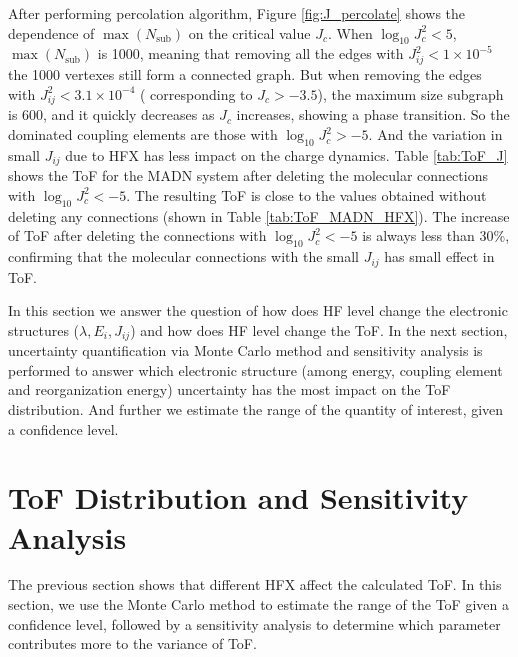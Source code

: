 \documentclass[%
 reprint,
 amsmath,amssymb,
 aps,
]{revtex4-2}
\begin{document}
After performing percolation algorithm, Figure \ref{fig:J_percolate} shows the dependence of $\max({N_\text{sub}})$ on the critical value $J_c$. When $\log_{10} J_c^2 < 5$, $\max({N_\text{sub}})$ is 1000, meaning that removing all the edges with $J_{ij}^2 < 1 \times 10^{-5}$ the 1000 vertexes still form a connected graph. 
But when removing the edges with $J_{ij}^2 < 3.1 \times 10^{-4}$ ( corresponding to $J_c > -3.5$), the maximum size subgraph is 600, and it quickly decreases as $J_c$ increases, showing a phase transition. 
So the dominated coupling elements are those with $\log_{10} J_c^2 > -5$. 
And the variation in small $J_{ij}$ due to HFX has less impact on the charge dynamics. Table \ref{tab:ToF_J} shows the ToF for the MADN system after deleting the molecular connections with  $\log_{10} J_c^2 < -5$. The resulting ToF is close to the values obtained without deleting any connections (shown in Table \ref{tab:ToF_MADN_HFX}).
The increase of ToF after deleting the connections with  $\log_{10} J_c^2 < -5$ is always less than 30\%, confirming that the molecular connections with the small $J_{ij}$ has small effect in ToF. 

In this section we answer the question of how does HF level change the electronic structures ($\lambda, E_i, J_{ij}$) and 
how does HF level change the ToF. 
In the next section, uncertainty quantification via Monte Carlo method and sensitivity analysis is performed to answer which electronic structure (among energy, coupling element and reorganization energy) uncertainty has the most impact on the ToF distribution. 
And further we estimate the range of the quantity of interest, given a confidence level.

\section{ToF Distribution and Sensitivity Analysis}
The previous section shows that different HFX affect the calculated ToF. In this section, we use the Monte Carlo method to estimate the range of the ToF given a confidence level, followed by a sensitivity analysis to determine which parameter contributes more to the variance of ToF. 
\end{document}
